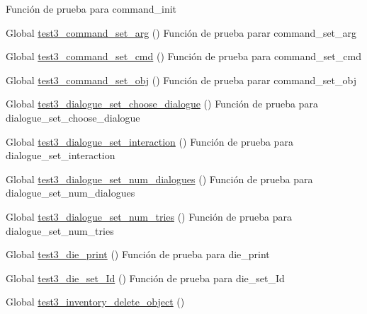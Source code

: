\begin{DoxyRefList}
Función de prueba para command\+\_\+init  
\item[Global \mbox{\hyperlink{command__test_8c_a42428bbf6c21406f8f2a36fd1c33e402}{test3\+\_\+command\+\_\+set\+\_\+arg}} ()]\label{test__test000018}%
%
Función de prueba parar command\+\_\+set\+\_\+arg  
\item[Global \mbox{\hyperlink{command__test_8c_a95514b5ec42e57daa0d4899271979e7e}{test3\+\_\+command\+\_\+set\+\_\+cmd}} ()]\label{test__test000012}%
%
Función de prueba para command\+\_\+set\+\_\+cmd  
\item[Global \mbox{\hyperlink{command__test_8c_abfd6a568c8ed93b7451d4ab0fa8ccb5d}{test3\+\_\+command\+\_\+set\+\_\+obj}} ()]\label{test__test000023}%
%
Función de prueba parar command\+\_\+set\+\_\+obj  
\item[Global \mbox{\hyperlink{dialogue__test_8c_a4cecf2d3ae3609eb6c15687e1e3d144b}{test3\+\_\+dialogue\+\_\+set\+\_\+choose\+\_\+dialogue}} ()]\label{test__test000043}%
%
Función de prueba para dialogue\+\_\+set\+\_\+choose\+\_\+dialogue  
\item[Global \mbox{\hyperlink{dialogue__test_8c_a1cb60ca9a099a54ab8ad714356efdf87}{test3\+\_\+dialogue\+\_\+set\+\_\+interaction}} ()]\label{test__test000048}%
%
Función de prueba para dialogue\+\_\+set\+\_\+interaction  
\item[Global \mbox{\hyperlink{dialogue__test_8c_a00f4fd6f3f897dca58d39ab3c1807759}{test3\+\_\+dialogue\+\_\+set\+\_\+num\+\_\+dialogues}} ()]\label{test__test000038}%
%
Función de prueba para dialogue\+\_\+set\+\_\+num\+\_\+dialogues  
\item[Global \mbox{\hyperlink{dialogue__test_8c_a7d6378914dc63cfbfa6365d2614d2922}{test3\+\_\+dialogue\+\_\+set\+\_\+num\+\_\+tries}} ()]\label{test__test000033}%
%
Función de prueba para dialogue\+\_\+set\+\_\+num\+\_\+tries  
\item[Global \mbox{\hyperlink{die__test_8c_a62332d2e0e931c7f9be50ae465157911}{test3\+\_\+die\+\_\+print}} ()]\label{test__test000064}%
%
Función de prueba para die\+\_\+print  
\item[Global \mbox{\hyperlink{die__test_8c_a59002b3b047f105c24501a3350c183d3}{test3\+\_\+die\+\_\+set\+\_\+\+Id}} ()]\label{test__test000057}%
%
Función de prueba para die\+\_\+set\+\_\+\+Id  
\item[Global \mbox{\hyperlink{inventory__test_8c_a66005d07626ca1dae670ddc7fc3a9514}{test3\+\_\+inventory\+\_\+delete\+\_\+object}} ()]\label{test__test000082}%

\end{DoxyRefList}
